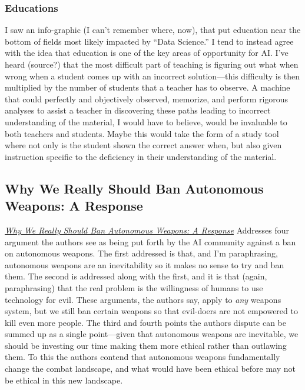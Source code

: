\documentclass[11pt]{article}  %
\begin{document}
\begin{enumerate}
\begin{enumerate}
    \subsubsection{Educations}    
    I saw an info-graphic (I can't remember where, now), that put education near
    the bottom of fields most likely impacted by ``Data Science.''  I
    tend to instead agree with the idea that education is one of the key areas
    of opportunity for AI.  I've heard (source?) that the most difficult part of
    teaching is figuring out what when wrong when a student comes up with an incorrect
    solution---this difficulty is then multiplied by the number of students that
    a teacher has to observe.  A machine that could perfectly and
    objectively observed, memorize, and perform rigorous analyses to assist a
    teacher in discovering these paths leading to incorrect understanding of
    the material, I would have to believe, would be invaluable to both teachers
    and students.  Maybe this would take the form of a study tool where not only
    is the student shown the correct answer when, but also given instruction
    specific to the deficiency in their understanding of the material.
    
    \subsection{Why We Really Should Ban Autonomous Weapons: A Response}
    \par\href{http://spectrum.ieee.org/automaton/robotics/artificial-intelligence/why-we-really-should-ban-autonomous-weapons}{\emph{Why
    We Really Should Ban Autonomous Weapons: A Response}} Addresses four
    argument the authors see as being put forth by the AI community against a
    ban on autonomous weapons. The first addressed is that, and I'm
    paraphrasing, autonomous weapons are an inevitability so it makes no sense
    to try and ban them. The second is addressed along with the first, and it is
    that (again, paraphrasing) that the real problem is the willingness of
    humans to use technology for evil. These arguments, the authors say, apply
    to \emph{any} weapons system, but we still ban certain weapons so that
    evil-doers are not empowered to kill even more people. The third and fourth
    points the authors dispute can be summed up as a single point---given that
    autonomous weapons are inevitable, we should be investing our time making
    them more ethical rather than outlawing them. To this the authors contend
    that autonomous weapons fundamentally change the combat landscape, and what
    would have been ethical before may not be ethical in this new landscape.


\end{enumerate}
\end{enumerate}
\end{document}
